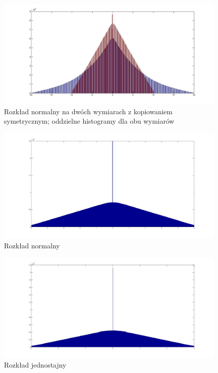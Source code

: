 \documentclass{mini}
\begin{document}
\begin{figure}[H]
\centering
\includegraphics[width=\textwidth]{ri_n_10M_2__20_20__10_10_4_1D}
\caption{Rozkład normalny na dwóch wymiarach z kopiowaniem symetrycznym; oddzielne histogramy dla obu wymiarów}
\end{figure}

\begin{figure}[H]
\centering
\includegraphics[width=\textwidth]{ri_n_20M_1__5_5}
\caption{Rozkład normalny}
\end{figure}

\begin{figure}[H]
\centering
\includegraphics[width=\textwidth]{ri_j_20M_1__3_3}
\caption{Rozkład jednostajny}
\end{figure}
\end{document}
